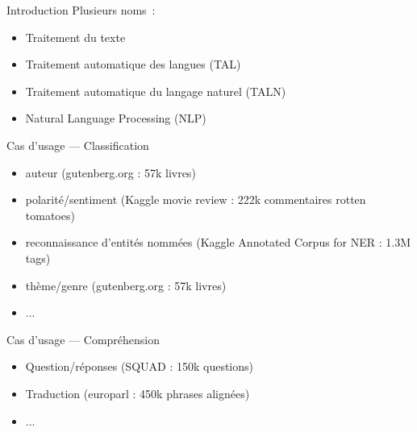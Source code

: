 \begin{frame}{Introduction}
  Plusieurs noms~:
  \begin{itemize}[<+->]
    \item Traitement du texte
    \item Traitement automatique des langues (TAL)
    \item Traitement automatique du langage naturel (TALN)
    \item Natural Language Processing (NLP)
  \end{itemize}

\end{frame}

\begin{frame}{Cas d'usage --- Classification}
  \begin{itemize}
  \item auteur (gutenberg.org : 57k livres)
  \item polarité/sentiment (Kaggle movie review : 222k commentaires rotten tomatoes)
  \item reconnaissance d'entités nommées (Kaggle Annotated Corpus for NER : 1.3M tags)
  \item thème/genre (gutenberg.org : 57k livres)
  \item ...
  \end{itemize}
\end{frame}

\begin{frame}{Cas d'usage --- Compréhension}
  \begin{itemize}
  \item Question/réponses (SQUAD : 150k questions)
  \item Traduction (europarl : 450k phrases alignées)
  \item ...
  \end{itemize}
\end{frame}
